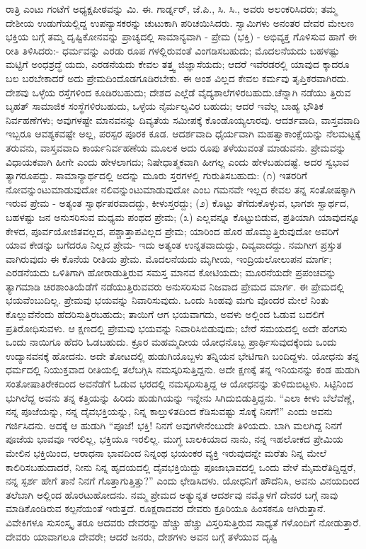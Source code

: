 ರಾತ್ರಿ ಎಂಟು ಗಂಟೆಗೆ ಅಧ್ಯಕ್ಷಪೀಠವನ್ನು ಮಿ. ಈ. ಗಾರ್ಡ್ನರ್, ಜೆ.ಪಿ., ಸಿ. ಸಿ., ಅವರು ಅಲಂಕರಿಸಿದರು; ತಮ್ಮ ದೇಶೀಯ ಉಡುಗೆಯಲ್ಲಿದ್ದ ಉಪನ್ಯಾಸಕರನ್ನು ಚುಟುಕಾಗಿ ಪರಿಚಯಿಸಿದರು. ಸ್ವಾಮಿಗಳು ಅನಂತರ ದೇವರ ಮೇಲಣ ಭಕ್ತಿಯ ಬಗ್ಗೆ ತಮ್ಮ ದೃಷ್ಟಿಕೋನವನ್ನು ಪ್ರಾಚ್ಯದಲ್ಲಿ ಸಾಮಾನ್ಯವಾಗಿ - ಪ್ರೇಮ (ಭಕ್ತಿ) - ಅಭಿವ್ಯಕ್ತ ಗೊಳಿಸುವ ಹಾಗೆ ಈ ರೀತಿ ತಿಳಿಸಿದರು:- ಧರ್ಮವನ್ನು ಎರಡು ರೂಪ ಗಳಲ್ಲಿರುವಂತೆ ವಿಂಗಡಿಸಬಹುದು; ಮೊದಲನೆಯದು ಬಹಳಷ್ಟು ಮಟ್ಟಿಗೆ ಅಂಧಶ್ರದ್ಧೆ ಯದು, ಎರಡನೆಯದು ಕೇವಲ ತತ್ತ್ವ ಜಿಜ್ಞಾಸೆಯದು; ಆದರೆ ಇವೆರಡರಲ್ಲಿ ಯಾವುದ ಕ್ಕಾದರೂ ಬಲ ಬರಬೇಕಾದರೆ ಅದು ಪ್ರೇಮದಿಂದೊಡಗೂಡಿರಬೇಕು. ಈ ಅಂಶ ವಿಲ್ಲದ ಕೇವಲ ಕರ್ಮವು ತೃಪ್ತಿಕರವಾಗಿರದು. ದೇಶವು ಒಳ್ಳೆಯ ರಸ್ತೆಗಳಿಂದ ಕೂಡಿರಬಹುದು; ದೇಶದ ಎಲ್ಲೆಡೆ ವೈದ್ಯಶಾಲೆಗಳಿರಬಹುದು.ಚೆನ್ನಾಗಿ ನಡೆಯು ತ್ತಿರುವ ಬೃಹತ್ ಸಾಮಾಜಿಕ ಸಂಸ್ಥೆಗಳಿರಬಹುದು, ಒಳ್ಳೆಯ ನೈರ್ಮಲ್ಯವಿರ ಬಹುದು; ಆದರೆ ಇವೆಲ್ಲ ಬಾಹ್ಯ ಭೌತಿಕ ನಿರ್ವಹಣೆಗಳು; ಅವುಗಳಷ್ಟೇ ಮಾನವನನ್ನು ದಿವ್ಯತೆಯ ಸಮೀಪಕ್ಕೆ ಕೊಂಡೊಯ್ಯಲಾರವು. ಆದರ್ಶವಾದಿ, ವಾಸ್ತವವಾದಿ ಇಬ್ಬರೂ ಆವಶ್ಯಕವಷ್ಟೇ ಅಲ್ಲ, ಪರಸ್ಪರ ಪೂರಕ ಕೂಡ. ಆದರ್ಶವಾದಿ ಧೈರ್ಯವಾಗಿ ಮಹತ್ವಾಕಾಂಕ್ಷೆಯನ್ನು ನೆಲಮಟ್ಟಕ್ಕೆ ತರುವನು, ವಾಸ್ತವವಾದಿ ಕಾರ್ಯನಿರ್ವಹಣೆಯ ಮೂಲಕ ಅದು ರೂಪು ತಳೆಯುವಂತೆ ಮಾಡುವನು. ಪ್ರೇಮವನ್ನು ವಿಧಾಯಕವಾಗಿ ಹೀಗೇ ಎಂದು ಹೇಳಲಾಗದು; ನಿಷೇಧಾತ್ಮಕವಾಗಿ ಹೀಗಲ್ಲ ಎಂದು ಹೇಳಬಹುದಷ್ಟೆ. ಅದರ ಸ್ವಭಾವ ತ್ಯಾಗರೂಪದ್ದು. ಸಾಮಾನ್ಯಾರ್ಥದಲ್ಲಿ ಅದನ್ನು ಮೂರು ಸ್ತರಗಳಲ್ಲಿ ಗುರುತಿಸಬಹುದು: (೧) ಇತರರಿಗೆ ನೋವನ್ನುಂಟುಮಾಡುವುದೋ ನಲಿವನ್ನುಂಟುಮಾಡುವುದೋ ಎಂಬ ಗಮನವೇ ಇಲ್ಲದ ಕೇವಲ ತನ್ನ ಸಂತೋಷಕ್ಕಾಗಿ ಇರುವ ಪ್ರೇಮ - ಅತ್ಯಂತ ಸ್ವಾರ್ಥಪರವಾದದ್ದು, ಕೀಳುಸ್ತರದ್ದು; (೨) ಕೊಟ್ಟು ತೆಗೆದುಕೊಳ್ಳುವ, ಭಾಗಶಃ ಸ್ವಾರ್ಥದ, ಬಹಳಷ್ಟು ಜನ ಅನುಸರಿಸುವ ಮಧ್ಯಮ ಪಂಥದ ಪ್ರೇಮ; (೩) ಎಲ್ಲವನ್ನೂ ಕೊಟ್ಟುಬಿಡುವ, ಪ್ರತಿಯಾಗಿ ಯಾವುದನ್ನೂ ಕೇಳದ, ಪೂರ್ವಯೋಜಿತವಲ್ಲದ, ಪಶ್ಚಾತ್ತಾಪವಿಲ್ಲದ ಪ್ರೇಮ; ಯಾರಿಂದ ಹೊರ ಹೊಮ್ಮುತ್ತಿರುವುದೋ ಅವರಿಗೆ ಯಾವ ಕೇಡನ್ನು ಬಗೆದರೂ ನಿಲ್ಲದ ಪ್ರೇಮ- ಇದು ಅತ್ಯಂತ ಉನ್ನತವಾದುದ್ದು, ದಿವ್ಯವಾದದ್ದು. ನಮಗೀಗ ಪ್ರಸ್ತುತ ವಾಗಿರುವುದು ಈ ಕೊನೆಯ ರೀತಿಯ ಪ್ರೇಮ. ಮೊದಲನೆಯದು ಮೃಗೀಯ, ಇಂದ್ರಿಯಲೋಲುಪನ ಮಾರ್ಗ; ಎರಡನೆಯದು ಒಳಿತಿಗಾಗಿ ಹೋರಾಡುತ್ತಿರುವ ಸಮಸ್ತ ಮಾನವ ಕೋಟಿಯದು; ಮೂರನೆಯದೇ ಪ್ರಪಂಚವನ್ನು ತ್ಯಾಗಮಾಡಿ ಚಿರಶಾಂತಿಯೆಡೆಗೆ ನಡೆಯುತ್ತಿರುವವರು ಅನುಸರಿಸುವ ನಿಜವಾದ ಪ್ರೇಮದ ಮಾರ್ಗ. ಈ ಪ್ರೇಮದಲ್ಲಿ ಭಯವೆಂಬುದಿಲ್ಲ. ಪ್ರೇಮವು ಭಯವನ್ನು ನಿವಾರಿಸುವುದು. ಒಂದು ಸಿಂಹವು ಮಗು ವೊಂದರ ಮೇಲೆ ನಿಂತು ಕೊಲ್ಲುವೆನೆಂದು ಹೆದರಿಸುತ್ತಿರಬಹುದು; ತಾಯಿಗೆ ಆಗ ಭಯವಾಗದು, ಅವಳು ಅಲ್ಲಿಂದ ಓಡುವ ಬದಲಿಗೆ ಪ್ರತಿರೋಧಿಸುವಳು. ಆ ಕ್ಷಣದಲ್ಲಿ ಪ್ರೇಮವು ಭಯವನ್ನು ನಿವಾರಿಸಿಬಿಡುವುದು; ಬೇರೆ ಸಮಯದಲ್ಲಿ ಅದೇ ಹೆಂಗಸು ಒಂದು ನಾಯಿಗೂ ಹೆದರಿ ಓಡಬಹುದು. ಕ್ರೂರ ಮಹಮ್ಮದೀಯ ಯೋಧನೊಬ್ಬ ಪ್ರಾರ್ಥಿಸುವುದಕ್ಕೆಂದು ಒಂದು ಉದ್ಯಾನವನಕ್ಕೆ ಹೋದನು. ಅದೇ ತೋಟದಲ್ಲಿ ಹುಡುಗಿಯೊಬ್ಬಳು ತನ್ನಿಯನ ಭೇಟಿಗಾಗಿ ಬಂದಿದ್ದಳು. ಯೋಧನು ತನ್ನ ಧರ್ಮದಲ್ಲಿ ನಿಯುಕ್ತವಾದ ರೀತಿಯಲ್ಲಿ ತಲೆಬಗ್ಗಿಸಿ ನಮಸ್ಕರಿಸುತ್ತಿದ್ದನು. ಅದೇ ಕ್ಷಣಕ್ಕೆ ತನ್ನ ಇನಿಯನನ್ನು ಕಂಡ ಹುಡುಗಿ ಸಂತೋಷಾತಿರೇಕದಿಂದ ಅವನೆಡೆಗೆ ಓಡುವ ಭರದಲ್ಲಿ ನಮಸ್ಕರಿಸುತ್ತಿದ್ದ ಆ ಯೋಧನನ್ನು ತುಳಿದುಬಿಟ್ಟಳು. ಸಿಟ್ಟಿನಿಂದ ಭುಗಿಲೆದ್ದ ಅವನು ತನ್ನ ಕತ್ತಿಯನ್ನು ಹಿರಿದು ಹುಡುಗಿಯನ್ನು ಇನ್ನೇನು ಸಿಗಿದುಬಿಡುತ್ತಿದ್ದನು. “ಎಲಾ ಕೀಳು ಬೆಲೆವೆಣ್ಣೆ, ನನ್ನ ಪೂಜೆಯನ್ನು, ನನ್ನ ದೈವಭಕ್ತಿಯನ್ನು, ನಿನ್ನ ಕಾಲ್ತುಳಿತದಿಂದ ಕೆಡಿಸುವಷ್ಟು ಸೊಕ್ಕೆ ನಿನಗೆ!” ಎಂದು ಅವನು ಗರ್ಜಿಸಿದನು. ಅದಕ್ಕೆ ಆ ಹುಡುಗಿ “ಪೂಜೆ! ಭಕ್ತಿ! ನಿನಗೆ ಅವುಗಳೇನೆಂಬುದೇ ತಿಳಿಯದು. ಬಾಗಿ ಮಲಗಿದ್ದ ನಿನಗೆ ಪೂಜೆಯ ಭಾವವೂ ಇರಲಿಲ್ಲ, ಭಕ್ತಿಯೂ ಇರಲಿಲ್ಲ. ಮುಗ್ಧ ಬಾಲಕಿಯಾದ ನಾನು, ನನ್ನ ಇಹಲೋಕದ ಪ್ರೇಮಿಯ ಮೇಲಿನ ಭಕ್ತಿಯಿಂದ, ಆರಾಧನಾ ಭಾವದಿಂದ ನಿನ್ನಂಥ ಭಯಂಕರ ವ್ಯಕ್ತಿ ಇರುವುದನ್ನೇ ಮರೆತು ನಿನ್ನ ಮೇಲೆ ಕಾಲಿರಿಸಬಹುದಾದರೆ, ನೀನು ನಿನ್ನ ಹೃದಯದಲ್ಲಿ ದೈವಭಕ್ತಿಯಿದ್ದು ಪೂಜಾಭಾವದಲ್ಲಿ ಒಂದು ವೇಳೆ ಮೈಮರೆತಿದ್ದಿದ್ದರೆ, ನನ್ನ ಸ್ಪರ್ಶ ಹೇಗೆ ತಾನೆ ನಿನಗೆ ಗೊತ್ತಾಗುತ್ತಿತ್ತು?” ಎಂದು ಛೇಡಿಸಿದಳು. ಯೋಧನಿಗೆ ಹೌದೆನಿಸಿ, ಅವನು ವಿನಯದಿಂದ ತಲೆಬಾಗಿ ಅಲ್ಲಿಂದ ಹೊರಟುಹೋದನು. ನಮ್ಮ ಪ್ರೇಮದ ಅತ್ಯುನ್ನತ ಆದರ್ಶವು ನಮ್ಮೊಳಗೆ ದೇವರ ಬಗ್ಗೆ ನಾವು ಮಾಡಿಕೊಂಡಿರುವ ಕಲ್ಪನೆಯಂತೆ ಇರುತ್ತದೆ. ರೂಕ್ಷರಾದವರ ದೇವರು ಕ್ರೂರಿಯೂ ಹಿಂಸಕನೂ ಆಗಿರುತ್ತಾನೆ. ವಿವೇಕಿಗಳೂ ಸುಸಂಸ್ಕೃ ತರೂ ಆದವರು ದೇವರನ್ನು ಹೆಚ್ಚು ಹೆಚ್ಚು ವಿಸ್ತರಿಸುತ್ತಿರುವ ಸಾಧ್ಯತೆ ಗಳೊಂದಿಗೆ ನೋಡುತ್ತಾರೆ. ದೇವರು ಯಾವಾಗಲೂ ದೇವರೇ; ಆದರೆ ಜನರು, ದೇಶಗಳು ಅವನ ಬಗ್ಗೆ ತಳೆಯುವ ದೃಷ್ಟಿ 